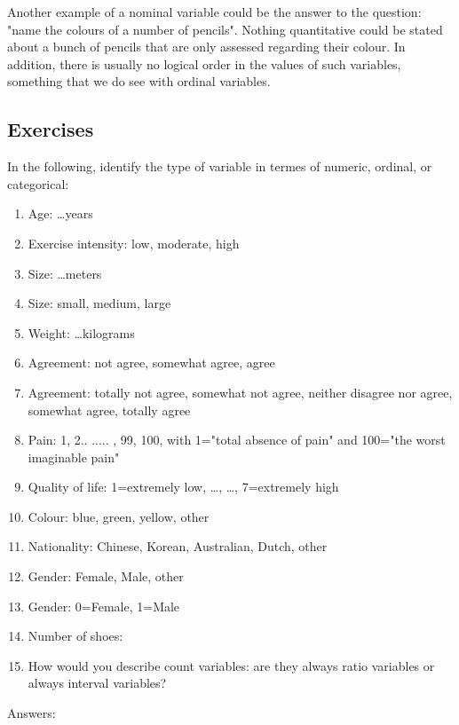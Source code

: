 \documentclass[]{book}\usepackage[]{graphicx}\usepackage[]{color}
\begin{document}
Another example of a nominal variable could be the answer to the question: "name the colours of a number of pencils". Nothing quantitative could be stated about a bunch of pencils that are only assessed regarding their colour. In addition, there is usually no logical order in the values of such variables, something that we do see with ordinal variables.

\subsection{Exercises}
In the following, identify the type of variable in termes of numeric, ordinal, or categorical:
\begin{enumerate}
\item Age: \dots years
\item Exercise intensity: low, moderate, high
\item Size: \dots meters
\item Size: small, medium, large
\item Weight: \dots kilograms
\item Agreement: not agree, somewhat agree, agree
\item Agreement: totally not agree, somewhat not agree, neither disagree nor agree, somewhat agree, totally agree
\item Pain: 1, 2.. ..... , 99, 100, with 1="total absence of pain" and 100="the worst imaginable pain"
\item Quality of life: 1=extremely low, \dots, \dots, 7=extremely high
\item Colour: blue, green, yellow, other
\item Nationality: Chinese, Korean, Australian, Dutch, other
\item Gender: Female, Male, other
\item Gender: 0=Female, 1=Male
\item Number of shoes:
\item How would you describe count variables: are they always ratio variables or always interval variables?
\end{enumerate}

Answers:
\end{document}
